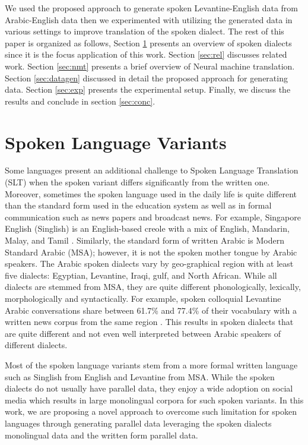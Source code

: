 \documentclass[a4paper]{article}
\begin{document}
We used the proposed approach to generate spoken Levantine-English data from Arabic-English data then we experimented with utilizing the generated data  in various settings to improve translation of the spoken dialect. The rest of this paper is organized as follows, Section \textsection\ref{sec:spoken} presents an overview of spoken dialects since it is the focus application of this work. Section \textsection\ref{sec:rel} discusses related work. Section \textsection\ref {sec:nmt} presents a brief overview of Neural machine translation. Section \textsection\ref{sec:datagen} discussed in detail the proposed approach for generating data. Section \textsection\ref{sec:exp} presents the experimental setup. Finally, we discuss the results and conclude in section \textsection\ref{sec:conc}.


\section{Spoken Language Variants}
\label{sec:spoken}

Some languages present an additional challenge to Spoken Language Translation (SLT) when the spoken variant differs significantly from the written one. Moreover, sometimes the spoken language used in the daily life is quite different than the standard form used in the education system as well as in formal communication such as news papers and  broadcast news. 
For example, Singapore English (Singlish)  is an English-based creole with a mix of English, Mandarin, Malay, and Tamil \cite{lim2010singapore}. Similarly, the  standard form of written Arabic is Modern Standard Arabic (MSA); however, it is not the spoken mother tongue by Arabic speakers.   The Arabic spoken dialects vary by geo-graphical region with at least five dialects: Egyptian, Levantine, Iraqi, gulf, and North African. While all dialects are stemmed from MSA, they are quite different  phonologically, lexically, morphologically and syntactically. For example, spoken colloquial Levantine Arabic conversations share between 61.7\% and 77.4\% of their vocabulary with a written news corpus from the same region \cite{Al-ShareefH11}. This results in spoken dialects that are quite different and not even well interpreted between Arabic speakers of different dialects. 

Most of the spoken language variants stem from a more formal written language such as Singlish from English and Levantine from MSA. While the spoken dialects do not usually have parallel data, they enjoy a wide adoption on social media which results in large monolingual corpora for such spoken variants. In this work, we are proposing a novel approach to overcome such limitation for spoken languages through generating parallel data leveraging the spoken dialects monolingual data and the written form parallel data.
\end{document}
